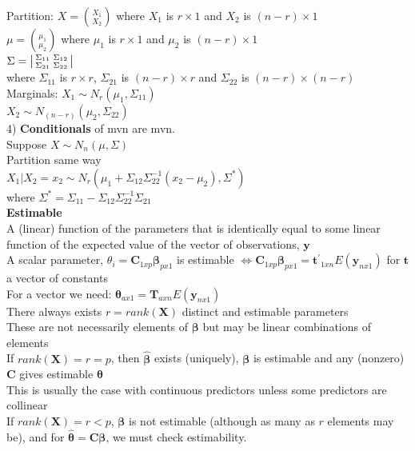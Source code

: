 \documentclass[10pt,landscape]{article}
\newenvironment{lsmallmatrix}
{\left|\begin{smallmatrix}}
	{\end{smallmatrix}\right|}
\newcommand{\B}{\beta}
\newcommand{\hb}{\hat{\beta}}
\newcommand{\lra}{\Leftrightarrow}
\begin{document}
\begin{multicols*}{4}
	Partition:
	$X={X_1 \choose X_2}$ where $X_1$ is $r\times 1$ and $X_2$ is $(n-r)\times 1$\\
	$\mu={\mu_1\choose \mu_2}$ where $\mu_1$ is $r\times 1$ and $\mu_2$ is $(n-r)\times 1$\\
	$\Sigma=
	\begin{lsmallmatrix}
	\Sigma_{11}&\Sigma_{12}\\
	\Sigma_{21}&\Sigma_{22}
	\end{lsmallmatrix}$\\
	where $\Sigma_{11}$ is $r\times r$, $\Sigma_{21}$ is $(n-r)\times r$ and $\Sigma_{22}$ is $(n-r)\times (n-r)$\\
	Marginals:
	$X_1\sim N_r(\mu_1,\Sigma_{11})$\\ 
 $X_2\sim N_{(n-r)}(\mu_2,\Sigma_{22})$\\
4) \textbf{Conditionals} of mvn are mvn.\\
	Suppose $X\sim N_n(\mu,\Sigma)$\\
Partition same way\\
	$X_1|X_2=x_2\sim N_r(\mu_1+\Sigma_{12}\Sigma_{22}^{-1}(x_2-\mu_2),\Sigma^*)$\\
	where $\Sigma^*=\Sigma_{11}-\Sigma_{12}\Sigma_{22}^{-1}\Sigma_{21}$\\
\textbf{Estimable}\\
A (linear) function of the parameters that is identically equal to some linear function of the expected value of the vector of observations, $\bm{y}$\\
A scalar parameter,
	$\theta_i=\bm{C}_{1xp}\bm{\B}_{px1}$ is estimable $\lra \bm{C}_{1xp}\bm{\B}_{px1}=\bm{t^{'}}_{1xn}E(\bm{y}_{nx1})$
	for $\bm{t}$ a vector of constants\\
For a vector we need:
	$\bm{\theta}_{ax1}=\bm{T}_{axn}E(\bm{y}_{nx1})$\\
There always exists $r=rank(\bm{X})$ distinct and estimable parameters\\
These are not necessarily elements of $\bm{\B}$ but may be linear combinations of elements\\
If $rank(\bm{X})=r=p$, then $\bm{\hb}$ exists (uniquely), 
	$\bm{\B}$ is estimable and any (nonzero) $\bm{C}$ gives estimable $\bm{\theta}$\\
	This is usually the case with continuous predictors unless some predictors are collinear\\
If $rank(\bm{X})=r<p$, $\bm{\B}$ is not estimable (although as many as $r$ elements may be), and for $\bm{\hat{\theta}}=\bm{C\B}$, we must check estimability.\\

\end{multicols*}
\end{document}
